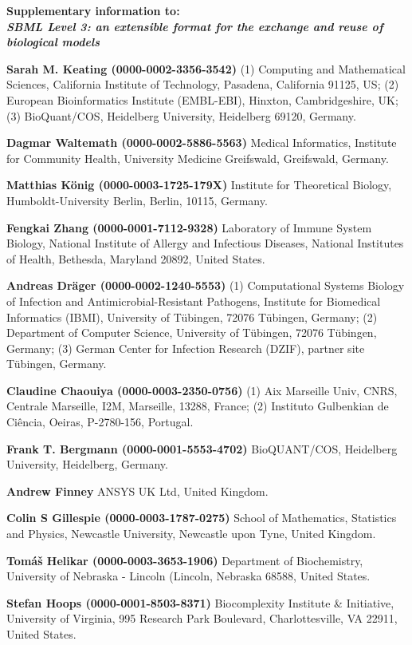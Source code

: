 \documentclass{sbml-paper}
\begin{document}
\begin{center}\large\bfseries
Supplementary information to:\\
\emph{SBML Level 3: an extensible format for the exchange and reuse of biological models}
\end{center}

\textbf{Sarah M. Keating (0000-0002-3356-3542)} (1) Computing and Mathematical Sciences, California Institute of Technology, Pasadena, California 91125, US; (2) European Bioinformatics Institute (EMBL-EBI), Hinxton, Cambridgeshire, UK; (3) BioQuant/COS, Heidelberg University, Heidelberg 69120, Germany.

\textbf{Dagmar Waltemath (0000-0002-5886-5563)} Medical Informatics, Institute for Community Health, University Medicine Greifswald, Greifswald, Germany.

\textbf{Matthias K\"{o}nig (0000-0003-1725-179X)} Institute for Theoretical Biology, Humboldt-University Berlin, Berlin, 10115, Germany.

\textbf{Fengkai Zhang (0000-0001-7112-9328)} Laboratory of Immune System Biology, National Institute of Allergy and Infectious Diseases, National Institutes of Health, Bethesda, Maryland 20892, United States.

\textbf{Andreas Dräger (0000-0002-1240-5553)} (1) Computational Systems Biology of Infection and Antimicrobial-Resistant Pathogens, Institute for Biomedical Informatics (IBMI), University of Tübingen, 72076 Tübingen, Germany; (2) Department of Computer Science, University of Tübingen, 72076 Tübingen, Germany; (3) German Center for Infection Research (DZIF), partner site Tübingen, Germany.

\textbf{Claudine Chaouiya (0000-0003-2350-0756)} (1) Aix Marseille Univ, CNRS, Centrale Marseille, I2M, Marseille, 13288, France; (2) Instituto Gulbenkian de Ciência, Oeiras, P-2780-156, Portugal.

\textbf{Frank T. Bergmann (0000-0001-5553-4702)} BioQUANT/COS, Heidelberg University, Heidelberg, Germany.

\textbf{Andrew Finney} ANSYS UK Ltd, United Kingdom.
	
\textbf{Colin S Gillespie (0000-0003-1787-0275)} School of Mathematics, Statistics and Physics, Newcastle University, Newcastle upon Tyne, United Kingdom.

\textbf{Tomáš Helikar (0000-0003-3653-1906)} Department of Biochemistry, University of Nebraska - Lincoln (Lincoln, Nebraska 68588, United States.

\textbf{Stefan Hoops (0000-0001-8503-8371)} Biocomplexity Institute \& Initiative, University of Virginia, 995 Research Park Boulevard, Charlottesville, VA 22911, United States.
\end{document}

